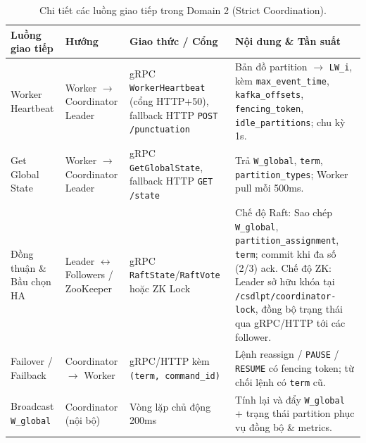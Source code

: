 \documentclass[12pt,a4paper]{article}
\begin{document}
\begin{table}[H]
    \centering
    \small
    \setlength{\tabcolsep}{4pt}
    \begin{tabular}{p{} p{} p{} p{}}
        \toprule
        \textbf{Luồng giao tiếp} & \textbf{Hướng} & \textbf{Giao thức / Cổng} & \textbf{Nội dung \& Tần suất} \\
        \midrule
        Worker Heartbeat & Worker $\to$ Coordinator Leader & gRPC \texttt{WorkerHeartbeat} (cổng HTTP+50), fallback HTTP \texttt{POST /punctuation} & Bản đồ partition $\to$ \texttt{LW\_i}, kèm \texttt{max\_event\_time}, \texttt{kafka\_offsets}, \texttt{fencing\_token}, \texttt{idle\_partitions}; chu kỳ 1s. \\
        Get Global State & Worker $\to$ Coordinator Leader & gRPC \texttt{GetGlobalState}, fallback HTTP \texttt{GET /state} & Trả \texttt{W\_global}, \texttt{term}, \texttt{partition\_types}; Worker pull mỗi 500ms. \\
        Đồng thuận \& Bầu chọn HA & Leader $\leftrightarrow$ Followers / ZooKeeper & gRPC \texttt{RaftState}/\texttt{RaftVote} hoặc ZK Lock & Chế độ Raft: Sao chép \texttt{W\_global}, \texttt{partition\_assignment}, \texttt{term}; commit khi đa số (2/3) ack. Chế độ ZK: Leader sở hữu khóa tại \texttt{/csdlpt/coordinator-lock}, đồng bộ trạng thái qua gRPC/HTTP tới các follower. \\
        Failover / Failback & Coordinator $\to$ Worker & gRPC/HTTP kèm \texttt{(term, command\_id)} & Lệnh reassign / \texttt{PAUSE} / \texttt{RESUME} có fencing token; từ chối lệnh có \texttt{term} cũ. \\
        Broadcast \texttt{W\_global} & Coordinator (nội bộ) & Vòng lặp chủ động 200ms & Tính lại và đẩy \texttt{W\_global} + trạng thái partition phục vụ đồng bộ \& metrics. \\
        \bottomrule
    \end{tabular}
    \caption{Chi tiết các luồng giao tiếp trong Domain 2 (Strict Coordination).}
\end{table}
\end{document}

